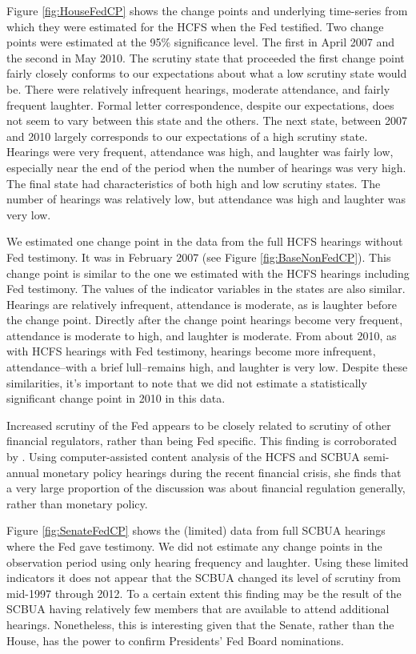 \documentclass[a4paper]{article}\usepackage[]{graphicx}\usepackage[]{color}
\begin{document}
Figure \ref{fig:HouseFedCP} shows the change points and underlying time-series from which they were estimated for the HCFS when the Fed testified. Two change points were estimated at the 95\% significance level. The first in April 2007 and the second in May 2010. The scrutiny state that proceeded the first change point fairly closely conforms to our expectations about what a low scrutiny state would be. There were relatively infrequent hearings, moderate attendance, and fairly frequent laughter. Formal letter correspondence, despite our expectations, does not seem to vary between this state and the others. The next state, between 2007 and 2010 largely corresponds to our expectations of a high scrutiny state. Hearings were very frequent, attendance was high, and laughter was fairly low, especially near the end of the period when the number of hearings was very high. The final state had characteristics of both high and low scrutiny states. The number of hearings was relatively low, but attendance was high and laughter was very low.

We estimated one change point in the data from the full HCFS hearings without Fed testimony. It was in February 2007 (see Figure \ref{fig:BaseNonFedCP}). This change point is similar to the one we estimated with the HCFS hearings including Fed testimony. The values of the indicator variables in the states are also similar. Hearings are relatively infrequent, attendance is moderate, as is laughter before the change point. Directly after the change point hearings become very frequent, attendance is moderate to high, and laughter is moderate. From about 2010, as with HCFS hearings with Fed testimony, hearings become more infrequent, attendance--with a brief lull--remains high, and laughter is very low. Despite these similarities, it's important to note that we did not estimate a statistically significant change point in 2010 in this data.

Increased scrutiny of the Fed appears to be closely related to scrutiny of other financial regulators, rather than being Fed specific. This finding is corroborated by \cite{SchonhardtBailey2012}. Using computer-assisted content analysis of the HCFS and SCBUA semi-annual monetary policy hearings during the recent financial crisis, she finds that a very large proportion of the discussion was about financial regulation generally, rather than monetary policy.

Figure \ref{fig:SenateFedCP} shows the (limited) data from full SCBUA hearings where the Fed gave testimony. We did not estimate any change points in the observation period using only hearing frequency and laughter. Using these limited indicators it does not appear that the SCBUA changed its level of scrutiny from mid-1997 through 2012. To a certain extent this finding may be the result of the SCBUA having relatively few members that are available to attend additional hearings. Nonetheless, this is interesting given that the Senate, rather than the House, has the power to confirm Presidents' Fed Board nominations.
\end{document}
